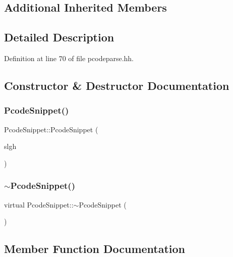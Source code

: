 \subsection*{Additional Inherited Members}


\subsection{Detailed Description}


Definition at line 70 of file pcodeparse.\+hh.



\subsection{Constructor \& Destructor Documentation}
\mbox{\label{class_pcode_snippet_a7bec86c6f170c157b82c56cb8630a84b}} 
\subsubsection{\texorpdfstring{PcodeSnippet()}{PcodeSnippet()}}
{\footnotesize\ttfamily Pcode\+Snippet\+::\+Pcode\+Snippet (\begin{DoxyParamCaption}\item[{const \mbox{\hyperlink{class_sleigh_base}{Sleigh\+Base}} $\ast$}]{slgh }\end{DoxyParamCaption})}

\mbox{\label{class_pcode_snippet_a62637fd83338517b4d5899c1865c8247}} 
\subsubsection{\texorpdfstring{$\sim$PcodeSnippet()}{~PcodeSnippet()}}
{\footnotesize\ttfamily virtual Pcode\+Snippet\+::$\sim$\+Pcode\+Snippet (\begin{DoxyParamCaption}\item[{void}]{ }\end{DoxyParamCaption})\hspace{0.3cm}{\ttfamily [virtual]}}



\subsection{Member Function Documentation}
\mbox{\label{class_pcode_snippet_adeeb03f199547eaf4f749e21b6f8c1cd}} 
